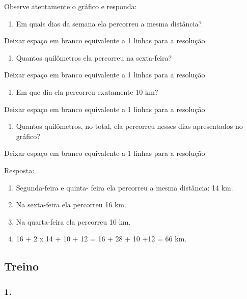 Observe atentamente o gráfico e responda:

\begin{enumerate}
\def\labelenumi{\alph{enumi})}
\item
  Em quais dias da semana ela percorreu a mesma distância?
\end{enumerate}

Deixar espaço em branco equivalente a 1 linhas para a resolução

\begin{enumerate}
\def\labelenumi{\alph{enumi})}
\item
  Quantos quilômetros ela percorreu na sexta-feira?
\end{enumerate}

Deixar espaço em branco equivalente a 1 linhas para a resolução

\begin{enumerate}
\def\labelenumi{\alph{enumi})}
\item
  Em que dia ela percorreu exatamente 10 km?
\end{enumerate}

Deixar espaço em branco equivalente a 1 linhas para a resolução

\begin{enumerate}
\def\labelenumi{\alph{enumi})}
\item
  Quantos quilômetros, no total, ela percorreu nesses dias apresentados
  no gráfico?
\end{enumerate}

Deixar espaço em branco equivalente a 1 linhas para a resolução

Resposta:

\begin{enumerate}
\def\labelenumi{\alph{enumi})}
\item
  Segunda-feira e quinta- feira ela percorreu a mesma distância: 14 km.
\item
  Na sexta-feira ela percorreu 16 km.
\item
  Na quarta-feira ela percorreu 10 km.
\item
  16 + 2 x 14 + 10 + 12 = 16 + 28 + 10 +12 = 66 km.
\end{enumerate}

\subsection{Treino}\label{treino-7}

\subsubsection{1.}\label{section-101}

